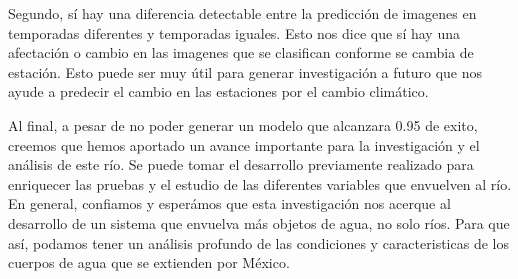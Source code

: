 \documentclass{article}
\begin{document}
Segundo, sí hay una diferencia detectable entre la predicción de imagenes en temporadas diferentes y temporadas iguales. Esto nos dice que sí hay una afectación o cambio en las imagenes que se clasifican conforme se cambia de estación. Esto puede ser muy útil para generar investigación a futuro que nos ayude a predecir el cambio en las estaciones por el cambio climático.

Al final, a pesar de no poder generar un modelo que alcanzara 0.95 de exito, creemos que hemos aportado un avance importante para la investigación y el análisis de este río. Se puede tomar el desarrollo previamente realizado para enriquecer las pruebas y el estudio de las diferentes variables que envuelven al río. En general, confiamos y esperámos que esta investigación nos acerque al desarrollo de un sistema que envuelva más objetos de agua, no solo ríos. Para que así, podamos tener un análisis profundo de las condiciones y caracteristicas de los cuerpos de agua que se extienden por México. 
\end{document}
